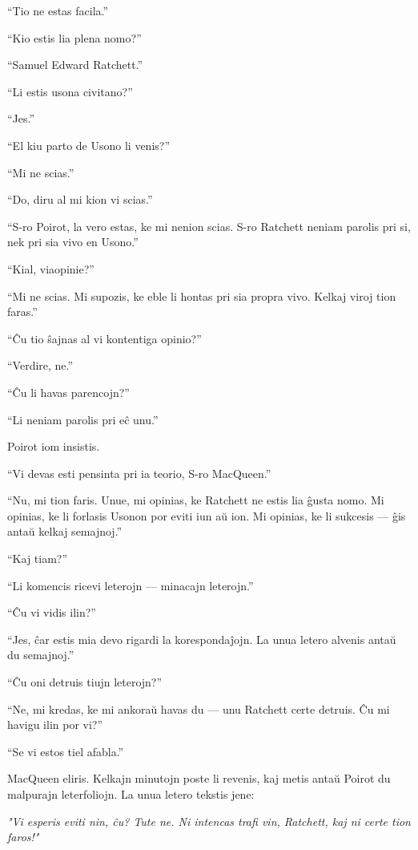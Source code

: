 ``Tio ne estas facila.''

``Kio estis lia plena nomo?''

``Samuel Edward Ratchett.''

``Li estis usona civitano?''

``Jes.''

``El kiu parto de Usono li venis?''

``Mi ne scias.''

``Do, diru al mi kion vi scias.''

``S-ro Poirot, la vero estas, ke mi nenion scias. S-ro Ratchett neniam parolis pri si, nek pri sia vivo en Usono.''

``Kial, viaopinie?''

``Mi ne scias. Mi supozis, ke eble li hontas pri sia propra vivo. Kelkaj viroj tion faras.''

``Ĉu tio ŝajnas al vi kontentiga opinio?''

``Verdire, ne.''

``Ĉu li havas parencojn?''

``Li neniam parolis pri eĉ unu.''

Poirot iom insistis.

``Vi devas esti pensinta pri ia teorio, S-ro MacQueen.''

``Nu, mi tion faris. Unue, mi opinias, ke Ratchett ne estis lia ĝusta nomo. Mi opinias, ke li forlasis Usonon por eviti iun aŭ ion. Mi opinias, ke li sukcesis --- ĝis antaŭ kelkaj semajnoj.''

``Kaj tiam?''

``Li komencis ricevi leterojn --- minacajn leterojn.''

``Ĉu vi vidis ilin?''

``Jes, ĉar estis mia devo rigardi la korespondaĵojn. La unua letero alvenis antaŭ du semajnoj.''

``Ĉu oni detruis tiujn leterojn?''

``Ne, mi kredas, ke mi ankoraŭ havas du --- unu Ratchett certe detruis. Ĉu mi havigu ilin por vi?''

``Se vi estos tiel afabla.''

MacQueen eliris. Kelkajn minutojn poste li revenis, kaj metis antaŭ Poirot du malpurajn leterfoliojn. La unua letero tekstis jene:

\begin{center}\itshape "Vi esperis eviti nin, ĉu? Tute ne. Ni intencas trafi vin, Ratchett, kaj ni certe tion faros!"\end{center}

